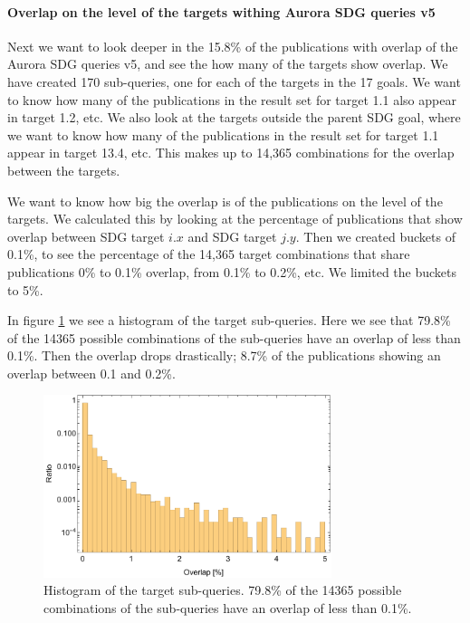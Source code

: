 \documentclass{article}
\begin{document}
\paragraph{Overlap on the level of the targets withing Aurora SDG queries v5}
Next we want to look deeper in the 15.8\% of the publications with overlap of the Aurora SDG queries v5, and see the how many of the targets show overlap. We have created 170 sub-queries, one for each of the targets in the 17 goals. We want to know how many of the publications in the result set for target 1.1 also appear in target 1.2, etc. We also look at the targets outside the parent SDG goal, where we want to know how many of the publications in the result set for target 1.1 appear in target 13.4, etc. This makes up to 14,365 combinations for the overlap between the targets.

We want to know how big the overlap is of the publications on the level of the targets. We calculated this by looking at the percentage of publications that show overlap between SDG target $i.x$ and SDG target $j.y$. Then we created buckets of 0.1\%, to see the percentage of the 14,365 target combinations that share publications 0\% to 0.1\% overlap, from 0.1\% to 0.2\%, etc. We limited the buckets to 5\%.

In figure \ref{subquerieshistogram} we see a histogram of the target sub-queries. Here we see that 79.8\% of the 14365 possible combinations of the sub-queries have an overlap of less than 0.1\%. Then the overlap drops drastically; 8.7\% of the publications showing an overlap between 0.1 and 0.2\%.

\begin{figure}[H]
	\centering
  \includegraphics[width=0.75\textwidth]{figures/subqueryhistogram.pdf}
	\caption{Histogram of the target sub-queries. 79.8\% of the 14365 possible combinations of the sub-queries have an overlap of less than 0.1\%.}
	\label{subquerieshistogram}
\end{figure}
\end{document}
